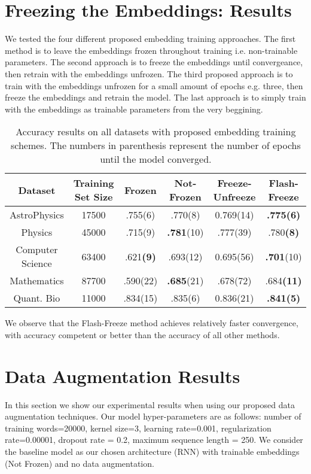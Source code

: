 \section{Freezing the Embeddings: Results}
We tested the four different proposed embedding training approaches.
The first method is to leave the embeddings frozen throughout training i.e. non-trainable parameters.
The second approach is to freeze the embeddings until convergeance, then retrain with the embeddings unfrozen.
The third proposed approach is to train with the embeddings unfrozen for a small amount of epochs e.g. three, then
freeze the embeddings and retrain the model.
The last approach is to simply train with the embeddings as trainable parameters from the very beggining.

\begin{center}\begin{table}[H]\begin{tabular}{||c c c c c c ||}
 \hline
 Dataset & Training Set Size & Frozen & Not-Frozen & Freeze-Unfreeze & Flash-Freeze\\ [0.5ex]
 \hline\hline
AstroPhysics & 17500 & .755(6) & .770(8) & 0.769(14) & \textbf{.775(6)}\\
Physics &  45000 & .715(9) & \textbf{.781}(10) & .777(39) & .780\textbf{(8)}\\
Computer Science & 63400 & .621\textbf{(9)} & .693(12) & 0.695(56) & \textbf{.701}(10)\\
Mathematics & 87700 & .590(22) & \textbf{.685}(21) & .678(72) & .684\textbf{(11)}\\
Quant. Bio & 11000 & .834(15) & .835(6) & 0.836(21) & \textbf{.841(5)}\\
 [1ex]\hline\end{tabular}\caption{Accuracy results on all datasets with proposed embedding training schemes.
 The numbers in parenthesis represent the number of epochs until the model converged.}
\end{table}\end{center}

We observe that the Flash-Freeze method achieves relatively faster convergence, with accuracy competent or better than
the accuracy of all other methods.

\section{Data Augmentation Results}
In this section we show our experimental results when using our proposed data augmentation techniques. Our model hyper-parameters are as follows:
number of training words=20000, kernel size=3, learning rate=0.001, regularization rate=0.00001,
dropout rate = 0.2, maximum sequence length = 250. We consider the baseline model as our chosen architecture (RNN) with
trainable embeddings (Not Frozen) and no data augmentation.

